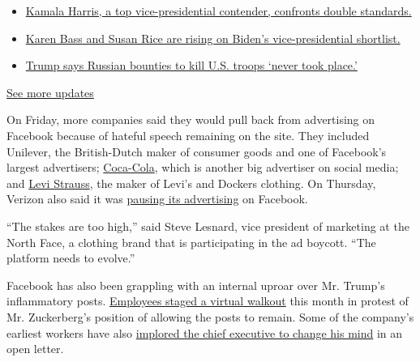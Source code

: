 \begin{itemize}
\tightlist
\item
  \href{https://www.nytimes.com/2020/07/31/us/elections/biden-vs-trump.html?action=click\&pgtype=Article\&state=default\&region=MAIN_CONTENT_1\&context=storylines_live_updates\#link-29fdff45}{Kamala
  Harris, a top vice-presidential contender, confronts double
  standards.}
\item
  \href{https://www.nytimes.com/2020/07/31/us/elections/biden-vs-trump.html?action=click\&pgtype=Article\&state=default\&region=MAIN_CONTENT_1\&context=storylines_live_updates\#link-13ec3d9c}{Karen
  Bass and Susan Rice are rising on Biden's vice-presidential
  shortlist.}
\item
  \href{https://www.nytimes.com/2020/07/31/us/elections/biden-vs-trump.html?action=click\&pgtype=Article\&state=default\&region=MAIN_CONTENT_1\&context=storylines_live_updates\#link-49e9a016}{Trump
  says Russian bounties to kill U.S. troops `never took place.'}
\end{itemize}

\href{https://www.nytimes.com/2020/07/31/us/elections/biden-vs-trump.html?action=click\&pgtype=Article\&state=default\&region=MAIN_CONTENT_1\&context=storylines_live_updates}{See
more updates}

On Friday, more companies said they would pull back from advertising on
Facebook because of hateful speech remaining on the site. They included
Unilever, the British-Dutch maker of consumer goods and one of
Facebook's largest advertisers;
\href{https://www.cnbc.com/2020/06/26/coca-cola-pauses-advertising-on-all-social-media-platforms-globally.html?__source=twitter\%7Cmain}{Coca-Cola},
which is another big advertiser on social media; and
\href{https://twitter.com/levis/status/1276670275732398081?s=21}{Levi
Strauss}, the maker of Levi's and Dockers clothing. On Thursday, Verizon
also said it was
\href{https://www.theverge.com/2020/6/25/21303717/verison-facebook-adl-ad-boycott-instagram-north-face-rei-ben-and-jerrys}{pausing
its advertising} on Facebook.

``The stakes are too high,'' said Steve Lesnard, vice president of
marketing at the North Face, a clothing brand that is participating in
the ad boycott. ``The platform needs to evolve.''

Facebook has also been grappling with an internal uproar over Mr.
Trump's inflammatory posts.
\href{https://www.nytimes.com/2020/06/01/technology/facebook-employee-protest-trump.html}{Employees
staged a virtual walkout} this month in protest of Mr. Zuckerberg's
position of allowing the posts to remain. Some of the company's earliest
workers have also
\href{https://www.nytimes.com/2020/06/03/technology/facebook-trump-employees-letter.html}{implored
the chief executive to change his mind} in an open letter.

